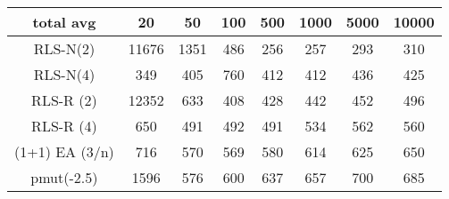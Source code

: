 \begin{tabular}[h]{cccccccc}
total avg&20&50&100&500&1000&5000&10000\\\hline
RLS-N(2)&11676&1351&486&256&257&293&310\\
RLS-N(4)&349&405&760&412&412&436&425\\
RLS-R (2)&12352&633&408&428&442&452&496\\
RLS-R (4)&650&491&492&491&534&562&560\\
(1+1) EA (3/n)&716&570&569&580&614&625&650\\
pmut(-2.5)&1596&576&600&637&657&700&685\\
\end{tabular}

